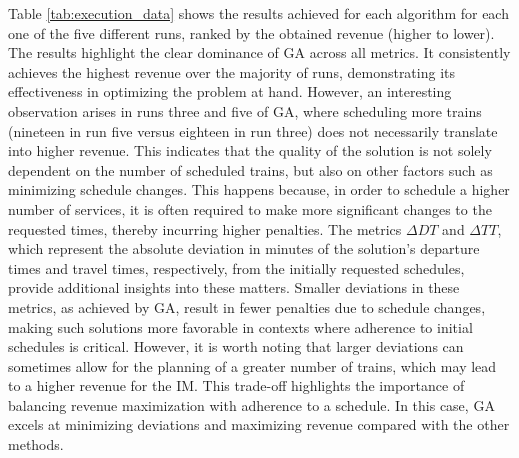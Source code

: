\documentclass[Afour,sagev,times]{sagej}
\begin{document}
Table \ref{tab:execution_data} shows the results achieved for each algorithm for each one of the five different runs, ranked by the obtained revenue (higher to lower). The results highlight the clear dominance of \gls{GA} across all metrics. It consistently achieves the highest revenue over the majority of runs, demonstrating its effectiveness in optimizing the problem at hand. However, an interesting observation arises in runs three and five of \gls{GA}, where scheduling more trains (nineteen in run five versus eighteen in run three) does not necessarily translate into higher revenue. This indicates that the quality of the solution is not solely dependent on the number of scheduled trains, but also on other factors such as minimizing schedule changes. This happens because, in order to schedule a higher number of services, it is often required to make more significant changes to the requested times, thereby incurring higher penalties. The metrics $ \Delta DT $ and $ \Delta TT $, which represent the absolute deviation in minutes of the solution's departure times and travel times, respectively, from the initially requested schedules, provide additional insights into these matters. Smaller deviations in these metrics, as achieved by \gls{GA}, result in fewer penalties due to schedule changes, making such solutions more favorable in contexts where adherence to initial schedules is critical. However, it is worth noting that larger deviations can sometimes allow for the planning of a greater number of trains, which may lead to a higher revenue for the \gls{IM}. This trade-off highlights the importance of balancing revenue maximization with adherence to a schedule. In this case, \gls{GA} excels at minimizing deviations and maximizing revenue compared with the other methods. 
\end{document}
